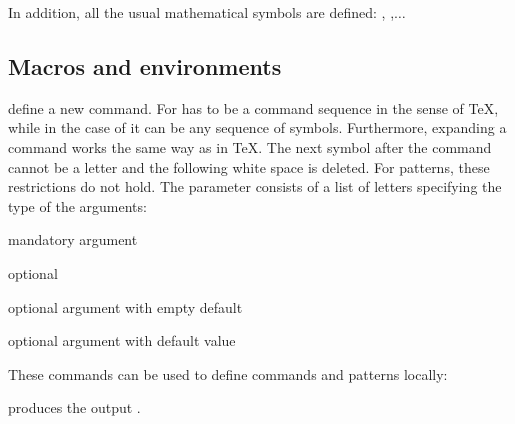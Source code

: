 In addition, all the usual mathematical symbols are defined\?: \cs{\alpha}, \cs{\sim},$\ldots$


\subsection{Macros and environments}   %


\begin{code}
   

   
\end{code}
define a new command. For   has to be a command sequence in the
sense of \TeX, while in the case of  it can be any sequence of symbols.
Furthermore, expanding a command works the same way as in \TeX. The next symbol after the
command cannot be a letter and the following white space is deleted. For patterns, these restrictions
do not hold. The parameter  consists of a list of letters specifying the type of the
arguments\?:

\begin{description}
\item{}mandatory argument
\item{}optional~\cs{*}
\item{}optional argument with empty default
\item{\blue{}\texttt\textlbrace{}\texttt\textrbrace}%
optional argument with default value
\end{description}

\begin{code}
  \cs{\savecommand} 

  \cs{\restorecommand} 

  \cs{\savepattern} 

  \cs{\restorepattern} 
\end{code}
These commands can be used to define commands and patterns locally\?:

\begin{code}

  \cs{\foo}

  \cs{\savecommand\foo}


  \cs{\foo}

  \cs{\restorecommand\foo}

  \cs{\foo}
\end{code}
produces the output   .

